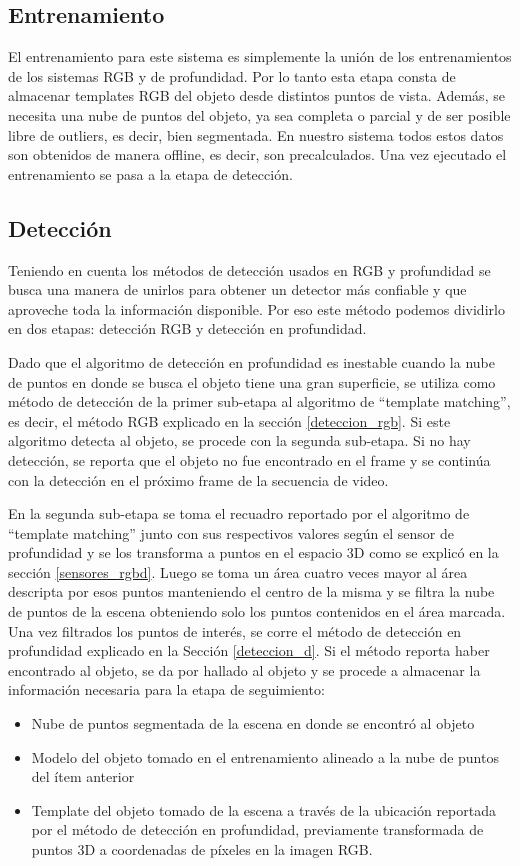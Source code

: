 \subsection{Entrenamiento}
El entrenamiento para este sistema es simplemente la unión de los entrenamientos de los sistemas RGB y de profundidad. Por lo tanto esta etapa consta de almacenar templates RGB del objeto desde distintos puntos de vista. Además, se necesita una nube de puntos del objeto, ya sea completa o parcial y de ser posible libre de outliers, es decir, bien segmentada. En nuestro sistema todos estos datos son obtenidos de manera offline, es decir, son precalculados. Una vez ejecutado el entrenamiento se pasa a la etapa de detección.

\subsection{Detección}\label{subsec:deteccion_rgbd}
Teniendo en cuenta los métodos de detección usados en RGB y profundidad se busca una manera de unirlos para obtener un detector más confiable y que aproveche toda la información disponible. Por eso este método podemos dividirlo en dos etapas: detección RGB y detección en profundidad.

Dado que el algoritmo de detección en profundidad es inestable cuando la nube de puntos en donde se busca el objeto tiene una gran superficie, se utiliza como método de detección de la primer sub-etapa al algoritmo de ``template matching'', es decir, el método RGB explicado en la sección \ref{deteccion_rgb}. Si este algoritmo detecta al objeto, se procede con la segunda sub-etapa. Si no hay detección, se reporta que el objeto no fue encontrado en el frame y se continúa con la detección en el próximo frame de la secuencia de video.

En la segunda sub-etapa se toma el recuadro reportado por el algoritmo de ``template matching'' junto con sus respectivos valores según el sensor de profundidad y se los transforma a puntos en el espacio 3D como se explicó en la sección \ref{sensores_rgbd}. Luego se toma un área cuatro veces mayor al área descripta por esos puntos manteniendo el centro de la misma y se filtra la nube de puntos de la escena obteniendo solo los puntos contenidos en el área marcada. Una vez filtrados los puntos de interés, se corre el método de detección en profundidad explicado en la Sección \ref{deteccion_d}. Si el método reporta haber encontrado al objeto, se da por hallado al objeto y se procede a almacenar la información necesaria para la etapa de seguimiento:
\begin{itemize}
	\item Nube de puntos segmentada de la escena en donde se encontró al objeto
	\item Modelo del objeto tomado en el entrenamiento alineado a la nube de puntos del ítem anterior
	\item Template del objeto tomado de la escena a través de la ubicación reportada por el método de detección en profundidad, previamente transformada de puntos 3D a coordenadas de píxeles en la imagen RGB.
\end{itemize}

